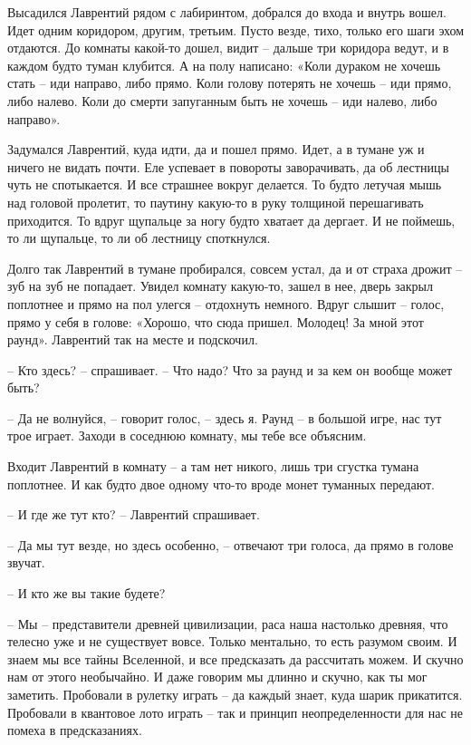 \documentclass[ebook,oneside,final,openright]{memoir}
\begin{document}
\par
Высадился Лаврентий рядом с лабиринтом, добрался до входа и внутрь вошел. Идет одним коридором, другим, третьим. Пусто везде, тихо, только его шаги эхом отдаются. До комнаты какой-то дошел, видит – дальше три коридора ведут, и в каждом будто туман клубится. А на полу написано: «Коли дураком не хочешь стать – иди направо, либо прямо. Коли голову потерять не хочешь – иди прямо, либо налево. Коли до смерти запуганным быть не хочешь – иди налево, либо направо».\par
\par
Задумался Лаврентий, куда идти, да и пошел прямо. Идет, а в тумане уж и ничего не видать почти. Еле успевает в повороты заворачивать, да об лестницы чуть не спотыкается. И все страшнее вокруг делается. То будто летучая мышь над головой пролетит, то паутину какую-то в руку толщиной перешагивать приходится. То вдруг щупальце за ногу будто хватает да дергает. И не поймешь, то ли щупальце, то ли об лестницу споткнулся.\par
\par
Долго так Лаврентий в тумане пробирался, совсем устал, да и от страха дрожит – зуб на зуб не попадает. Увидел комнату какую-то, зашел в нее, дверь закрыл поплотнее и прямо на пол улегся – отдохнуть немного. Вдруг слышит – голос, прямо у себя в голове: «Хорошо, что сюда пришел. Молодец! За мной этот раунд». Лаврентий так на месте и подскочил. \par
\par
– Кто здесь? – спрашивает. – Что надо? Что за раунд и за кем он вообще может быть?\par
– Да не волнуйся, – говорит голос, – здесь я. Раунд – в большой игре, нас тут трое играет. Заходи в соседнюю комнату, мы тебе все объясним.\par
 \par
Входит Лаврентий в комнату – а там нет никого, лишь три сгустка тумана поплотнее. И как будто двое одному что-то вроде монет туманных передают.\par
– И где же тут кто? – Лаврентий спрашивает.\par
– Да мы тут везде, но здесь особенно, – отвечают три голоса, да прямо в голове звучат.\par
– И кто же вы такие будете?\par
– Мы – представители древней цивилизации, раса наша настолько древняя, что телесно уже и не существует вовсе. Только ментально, то есть разумом своим. И знаем мы все тайны Вселенной, и все предсказать да рассчитать можем. И скучно нам от этого необычайно. И даже говорим мы длинно и скучно, как ты мог заметить. Пробовали в рулетку играть – да каждый знает, куда шарик прикатится. Пробовали в квантовое лото играть – так и принцип неопределенности для нас не помеха в предсказаниях.\par
\end{document}

